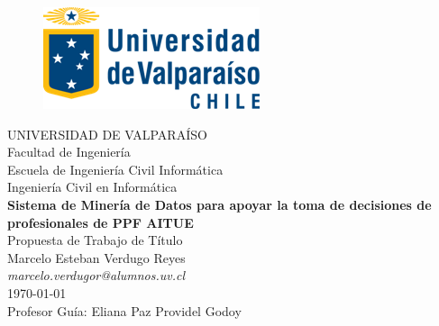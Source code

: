 \documentclass[12pt,letterpaper]{article}
\begin{document}
\begin{center}
\begin{figure}[ht]
\begin{center}
\includegraphics[scale=0.5]{logoUV.png}
\end{center}
\end{figure}
\thispagestyle{empty}

UNIVERSIDAD DE VALPARAÍSO \\
Facultad de Ingeniería \\
Escuela de Ingenier\'ia Civil Inform\'atica \\
Ingenier\'ia Civil en Inform\'atica\\
\vspace{1cm}
\Large
\textbf{Sistema de Minería de Datos para apoyar la toma de decisiones de profesionales de PPF AITUE}\\ 
\large 
Propuesta de Trabajo de T\'itulo \\
Marcelo Esteban Verdugo Reyes \\
\normalsize
\emph{marcelo.verdugor@alumnos.uv.cl} \\
\today \\
\vspace{1cm}
Profesor Gu\'ia:
Eliana Paz Providel Godoy
\end{center}



\begin{abstract}


En Chile existen diferentes familias que se encuentran en situaciones de riesgo, el cual repercute, ocasionalmente en vulneraciones de los derechos de los niños, niñas y adolescentes (NNA). Existen distintas instituciones para la protección de los integrantes de las familias dentro de estas se encuentran las corporaciones que buscan intervenir en ellas con el fin de brindar apoyo en las tareas de crianza y desarrollo personal de los NNA. 
En estas corporaciones los especialistas capacitados utilizan diferentes herramientas para analizar situaciones de riesgo en la cual se ven insertas estas familias, donde la experiencia en la toma de decisiones juega un rol fundamental.\\ 
Estas corporaciones por lo general no disponen de herramientas que utilicen Tecnologías de Informaci\'on y Comunicaci\'on (TIC) por lo cual en este Trabajo de T\'itulo se busca apoyar a los especialistas con herramientas TIC, para as\'i agilizar sus procesos y tambi\'en ser de ayuda a la hora de tomar decisiones.



\end{abstract}
\end{document}
